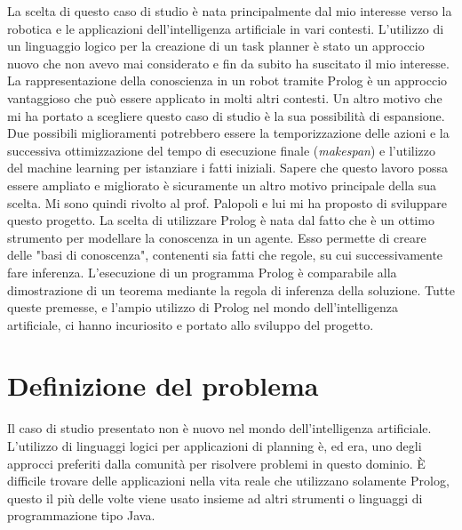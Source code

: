 La scelta di questo caso di studio è nata principalmente dal mio interesse verso la robotica e le applicazioni dell'intelligenza artificiale in vari contesti.
L'utilizzo di un linguaggio logico per la creazione di un task planner è stato un approccio nuovo che non avevo mai considerato e fin da subito ha suscitato il mio interesse. 
La rappresentazione della conoscienza in un robot tramite Prolog è un approccio vantaggioso che può essere applicato in molti altri contesti.
Un altro motivo che mi ha portato a scegliere questo caso di studio è la sua possibilità di espansione. Due possibili miglioramenti potrebbero essere
la temporizzazione delle azioni e la successiva ottimizzazione del tempo
di esecuzione finale (\textit{makespan}) e l'utilizzo del machine learning per istanziare i fatti iniziali.
Sapere che questo lavoro possa essere ampliato e migliorato è sicuramente un altro motivo principale della sua scelta.
Mi sono quindi rivolto al prof. Palopoli e lui mi ha proposto di sviluppare questo progetto.
La scelta di utilizzare Prolog è nata dal fatto che è un ottimo strumento per modellare la conoscenza in un agente.
Esso permette di creare delle "basi di conoscenza", contenenti sia fatti che regole, su cui successivamente fare inferenza.
L'esecuzione di un programma Prolog è comparabile alla dimostrazione di un teorema mediante la regola di inferenza della soluzione.
Tutte queste premesse, e l'ampio utilizzo di Prolog nel mondo dell'intelligenza artificiale, ci hanno incuriosito e portato allo sviluppo del progetto.

\section{Definizione del problema}
\label{sec:defprob}
Il caso di studio presentato non è nuovo nel mondo dell'intelligenza artificiale. L'utilizzo di linguaggi logici per applicazioni di planning è, ed era, uno
degli approcci preferiti dalla comunità per risolvere problemi in questo dominio. È difficile trovare delle applicazioni nella vita reale che utilizzano solamente Prolog, questo il 
più delle volte viene usato insieme ad altri strumenti o linguaggi di programmazione tipo Java. 

